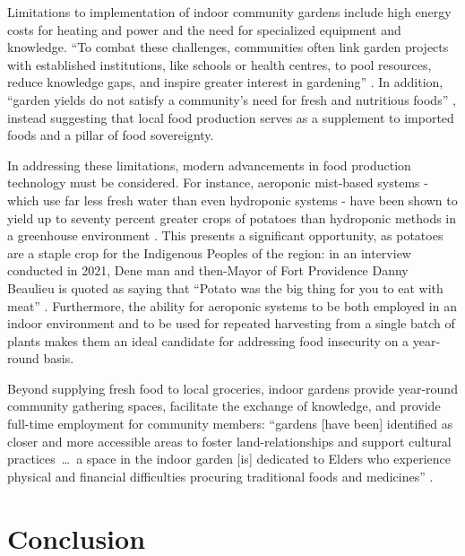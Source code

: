 \documentclass{report}
\begin{document}
\hspace{24pt} Limitations to implementation of indoor community gardens include high energy costs for heating and power and the need for specialized equipment and knowledge. ``To combat these challenges, communities often link garden projects with established institutions, like schools or health centres, to pool resources, reduce knowledge gaps, and inspire greater interest in gardening'' \parencite[90]{resilientcommunities}.
In addition, ``garden yields do not satisfy a community's need for fresh and nutritious foods'' \parencite[85]{resilientcommunities}, instead suggesting that local food production serves as a supplement to imported foods and a pillar of food sovereignty.

\hspace{24pt} In addressing these limitations, modern advancements in food production technology must be considered. For instance, aeroponic mist-based systems - which use far less fresh water than even hydroponic systems - have been shown to yield up to seventy percent greater crops of potatoes than hydroponic methods in a greenhouse environment \parencite{aeroponicpotatoes}.
This presents a significant opportunity, as potatoes are a staple crop for the Indigenous Peoples of the region: in an interview conducted in 2021, Dene man and then-Mayor of Fort Providence Danny Beaulieu is quoted as saying that ``Potato was the big thing for you to eat with meat'' \parencite[91]{resilientcommunities}. 
Furthermore, the ability for aeroponic systems to be both employed in an indoor environment and to be used for repeated harvesting from a single batch of plants makes them an ideal candidate for addressing food insecurity on a year-round basis.

\hspace{24pt} Beyond supplying fresh food to local groceries, indoor gardens provide year-round community gathering spaces, facilitate the exchange of knowledge, and provide full-time employment for community members: ``gardens [have been] identified as closer and more accessible areas to foster land-relationships and support cultural practices~\ldots~a space in the indoor garden [is] dedicated to Elders who experience physical and financial difficulties procuring traditional foods and medicines'' \parencite[99]{resilientcommunities}. 


\section{Conclusion}
\end{document}
